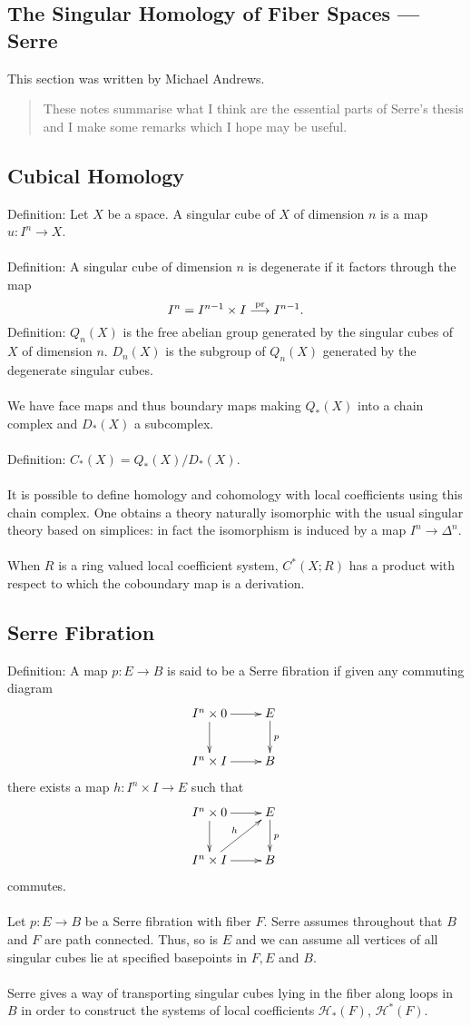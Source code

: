 \documentclass[11pt]{article}
\newcommand{\KanSemResponse}[1]
{
\thispagestyle{fancy}
\section{#1}
}
\begin{document}
\begin{Jandr SSS notes}
\KanSemResponse{The Singular Homology of Fiber Spaces --- Serre}
This section was written by Michael Andrews.
\begin{abstract}
		These notes summarise what I think are the essential parts of Serre's thesis and I make some remarks which I hope may be useful.
	\end{abstract}
\subsection{Cubical Homology}
Definition: Let $X$ be a space. A singular cube of $X$ of dimension $n$ is a map $u:I^n\to X$.\\
\\
Definition: A singular cube of dimension $n$ is degenerate if it factors through the map
\[I^n=I^{n-1}\times I\overset{\textup{pr}}{\to} I^{n-1}.\]
Definition: $Q_n(X)$ is the free abelian group generated by the singular cubes of $X$ of dimension $n$. $D_n(X)$ is the subgroup of $Q_n(X)$ generated by the degenerate singular cubes.\\
\\
We have face maps and thus boundary maps making $Q_*(X)$ into a chain complex and $D_*(X)$ a subcomplex.\\
\\
Definition: $C_*(X)=Q_*(X)/D_*(X)$.\\
\\
It is possible to define homology and cohomology with local coefficients using this chain complex. One obtains a theory naturally isomorphic with the usual singular theory based on simplices: in fact the isomorphism is induced by a map $I^n\to\Delta^n$.\\
\\
When $R$ is a ring valued local coefficient system, $C^*(X;R)$ has a product with respect to which the coboundary map is a derivation.


	\subsection{Serre Fibration}
Definition: A map $p:E\to B$ is said to be a Serre fibration if given any commuting diagram
\[\xymatrix{I^n\times 0\ar[r]\ar[d]&E\ar[d]^p\\I^n\times I\ar[r]&B}\]
there exists a map $h:I^n\times I\to E$ such that
\[\xymatrix{I^n\times 0\ar[r]\ar[d]&E\ar[d]^p\\I^n\times I\ar[r]\ar[ur]^h&B}\]
commutes.\\
\\
Let $p:E\to B$ be a Serre fibration with fiber $F$. Serre assumes throughout that $B$ and $F$ are path connected. Thus, so is $E$ and we can assume all vertices of all singular cubes lie at specified basepoints in $F,E$ and $B$.\\
\\
Serre gives a way of transporting singular cubes lying in the fiber along loops in $B$ in order to construct the systems of local coefficients $\mathscr{H}_*(F)$, $\mathscr{H}^*(F)$.



\end{Jandr SSS notes}
\end{document}
